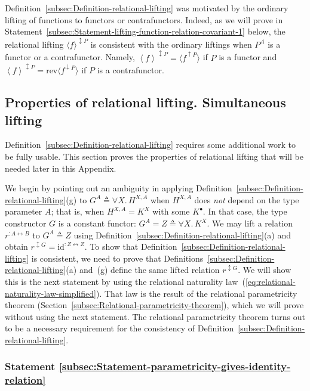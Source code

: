 Definition~\ref{subsec:Definition-relational-lifting} was motivated
by the ordinary lifting of functions to functors or contrafunctors.
Indeed, as we will prove in Statement~\ref{subsec:Statement-lifting-function-relation-covariant-1}
below, the relational lifting $\langle f\rangle^{\updownarrow P}$
is consistent with the ordinary liftings when $P^{A}$ is a functor
or a contrafunctor. Namely, $\left<f\right>^{\updownarrow P}=\langle f^{\uparrow P}\rangle$
if $P$ is a functor and $\left<f\right>^{\updownarrow P}=\text{rev}\langle f^{\downarrow P}\rangle$
if $P$ is a contrafunctor. 

\subsection{Properties of relational lifting. Simultaneous lifting}

Definition~\ref{subsec:Definition-relational-lifting} requires some
additional work to be fully usable. This section proves the properties
of relational lifting that will be needed later in this Appendix.

We begin by pointing out an ambiguity in applying Definition~\ref{subsec:Definition-relational-lifting}(g)
to $G^{A}\triangleq\forall X.\,H^{X,A}$ when $H^{X,A}$ does \emph{not}
depend on the type parameter $A$; that is, when $H^{X,A}=K^{X}$
with some $K^{\bullet}$. In that case, the type constructor $G$
is a constant functor: $G^{A}=Z\triangleq\forall X.\,K^{X}$. We may
lift a relation $r^{:A\leftrightarrow B}$ to $G^{A}\triangleq Z$
using Definition~\ref{subsec:Definition-relational-lifting}(a) and
obtain $r^{\updownarrow G}=\text{id}^{:Z\leftrightarrow Z}$. To show
that Definition~\ref{subsec:Definition-relational-lifting} is consistent,
we need to prove that Definitions~\ref{subsec:Definition-relational-lifting}(a)
and~(g) define the same lifted relation $r^{\updownarrow G}$. We
will show this is the next statement by using the relational naturality
law~(\ref{eq:relational-naturality-law-simplified}). That law is
the result of the relational parametricity theorem (Section~\ref{subsec:Relational-parametricity-theorem}),
which we will prove without using the next statement. The relational
parametricity theorem turns out to be a necessary requirement for
the consistency of Definition~\ref{subsec:Definition-relational-lifting}.

\subsubsection{Statement \label{subsec:Statement-parametricity-gives-identity-relation}\ref{subsec:Statement-parametricity-gives-identity-relation}}

